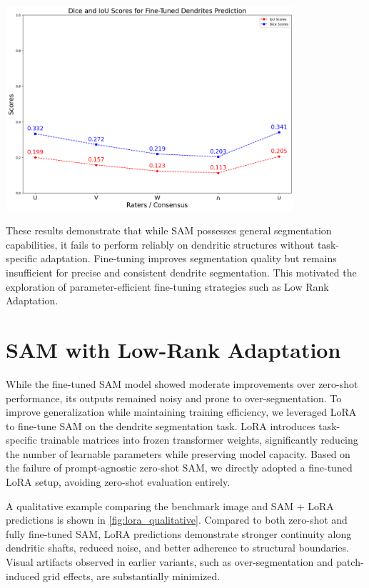 \begin{center}
\includegraphics[width=0.8\textwidth]{figures/26_sam_finetuned_metrics.png}
\label{fig:sam_finetuned_metrics}
\end{center}

These results demonstrate that while \gls{SAM} possesses general segmentation capabilities, it fails to perform reliably on dendritic structures without task-specific adaptation. Fine-tuning improves segmentation quality but remains insufficient for precise and consistent dendrite segmentation. This motivated the exploration of parameter-efficient fine-tuning strategies such as Low Rank Adaptation.

\section{SAM with Low-Rank Adaptation}
While the fine-tuned \gls{SAM} model showed moderate improvements over zero-shot performance, its outputs remained noisy and prone to over-segmentation. To improve generalization while maintaining training efficiency, we leveraged \gls{LoRA} to fine-tune \gls{SAM} on the dendrite segmentation task. \gls{LoRA} introduces task-specific trainable matrices into frozen transformer weights, significantly reducing the number of learnable parameters while preserving model capacity. Based on the failure of prompt-agnostic zero-shot \gls{SAM}, we directly adopted a fine-tuned \gls{LoRA} setup, avoiding zero-shot evaluation entirely.

A qualitative example comparing the benchmark image and \gls{SAM} + \gls{LoRA} predictions is shown in \autoref{fig:lora_qualitative}. Compared to both zero-shot and fully fine-tuned \gls{SAM}, \gls{LoRA} predictions demonstrate stronger continuity along dendritic shafts, reduced noise, and better adherence to structural boundaries. Visual artifacts observed in earlier variants, such as over-segmentation and patch-induced grid effects, are substantially minimized.


